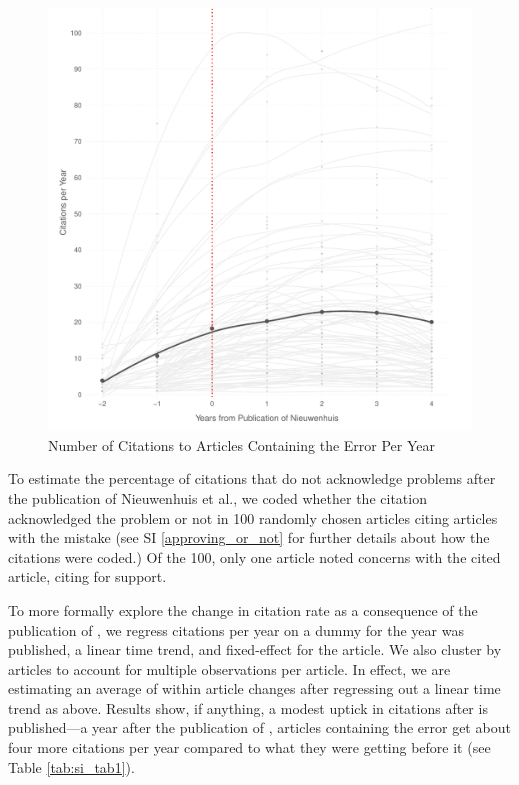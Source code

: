 \begin{figure}[H]
\centering
 \includegraphics[scale=.7]{../figs/nw_growth_curve.pdf}
 \caption{Number of Citations to Articles Containing the Error Per Year}
 \label{fig:niewenhuis}
\end{figure}

To estimate the percentage of citations that do not acknowledge problems after the publication of Nieuwenhuis et al., we coded whether the citation acknowledged the problem or not in 100 randomly chosen articles citing articles with the mistake (see SI \ref{approving_or_not} for further details about how the citations were coded.) Of the 100, only one article noted concerns with the cited article, citing \citep{nieuwenhuis2011} for support.

To more formally explore the change in citation rate as a consequence of the publication of \citet{nieuwenhuis2011}, we regress citations per year on a dummy for the year \citet{nieuwenhuis2011} was published, a linear time trend, and fixed-effect for the article. We also cluster by articles to account for multiple observations per article. In effect, we are estimating an average of within article changes after regressing out a linear time trend as above. Results show, if anything, a modest uptick in citations after \citet{nieuwenhuis2011} is published---a year after the publication of \citet{nieuwenhuis2011}, articles containing the error get about four more citations per year compared to what they were getting before it (see Table \ref{tab:si_tab1}).

